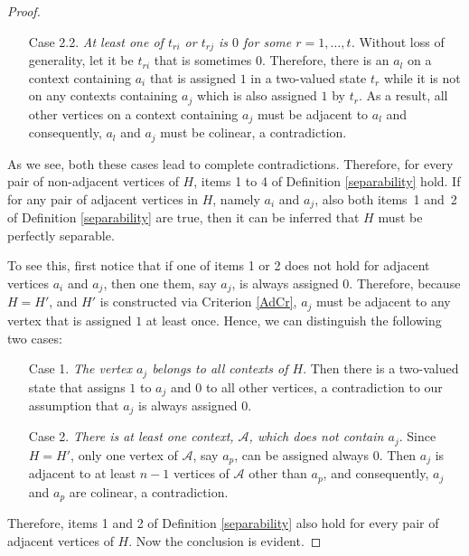 \documentclass[%
12pt,
prereprint,
showpacs,
showkeys,
preprintnumbers,
amsmath,amssymb,
aps,
pra,
longbibliography,
notitlepage
]{revtex4-1}
\theoremstyle{definition}
\begin{document}
\begin{proof}
\begin{itemize}
\begin{itemize}
                                \item[Case 2.2.] \emph{At least one of $t_{ri}$ or $t_{rj}$ is $0$ for some $r=1,\ldots,t$.} Without loss of generality, let it be $t_{ri}$ that is sometimes $0$. Therefore, there is an $a_l$ on a context containing $a_i$ that is assigned $1$ in a two-valued state $t_r$ while it is not on any contexts containing $a_j$ which is also assigned $1$ by $t_r$. As a result, all other vertices on a context containing $a_j$ must be adjacent to $a_l$ and consequently, $a_l$ and $a_j$ must be colinear, a contradiction.
                        \end{itemize}
                \end{itemize}
                As we see, both these cases lead to complete  contradictions. Therefore, for every pair of non-adjacent vertices of $H$, items 1 to 4 of Definition \ref{separability} hold. If for any pair of adjacent vertices in $H$, namely $a_i$ and $a_j$, also  both items~1 and~2 of Definition \ref{separability} are true, then it can be inferred that $H$ must be perfectly separable.

                To see this, first notice that if one of items 1 or 2 does not hold for adjacent vertices $a_i$ and $a_j$, then one them, say $a_j$, is always assigned $0$. Therefore, because $H=H'$, and $H'$ is constructed via Criterion \ref{AdCr}, $a_j$ must be adjacent to any vertex that is assigned $1$ at least once. Hence, we can distinguish the following two cases:

                \begin{itemize}
                        \item[Case 1.] \emph{The vertex $a_j$ belongs to all contexts of $H$}. Then there is a two-valued state that assigns $1$ to $a_j$ and $0$ to all other vertices, a contradiction to our assumption that $a_j$ is always assigned $0$.

                        \item[Case 2.] \emph{There is at least one context, $\mathcal{A}$, which does not contain $a_j$}. Since $H=H'$, only one vertex of $\mathcal{A}$, say $a_p$, can be assigned always $0$. Then $a_j$ is adjacent to at least $n-1$ vertices of $\mathcal{A}$ other than $a_p$, and consequently, $a_j$ and $a_p$ are colinear, a contradiction.
                \end{itemize}
                Therefore, items 1 and 2 of Definition \ref{separability} also hold for every pair of adjacent vertices of $H$. Now the conclusion is evident.
        \end{proof}
\end{document}
